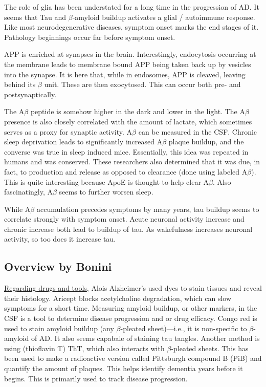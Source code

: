 The role of glia has been understated for a long time in the progression of AD. It seems that Tau and $\beta$-amyloid buildup activates a glial / autoimmune response. Like most neurodegenerative diseases, symptom onset marks the end stages of it. Pathology beginnings occur far before symptom onset.\newline

APP is enriched at synapses in the brain. Interestingly, endocytosis occurring at the membrane leads to membrane bound APP being taken back up by vesicles into the synapse. It is here that, while in endosomes, APP is cleaved, leaving behind its $\beta$ unit. These are then exocytosed. This can occur both pre- and postsynaptically.\newline

The A$\beta$ peptide is somehow higher in the dark and lower in the light. The A$\beta$ presence is also closely correlated with the amount of lactate, which sometimes serves as a proxy for synaptic activity. A$\beta$ can be measured in the CSF. Chronic sleep deprivation leads to significantly increased A$\beta$ plaque buildup, and the converse was true in sleep induced mice. Essentially, this idea was repeated in humans and was conserved. These researchers also determined that it was due, in fact, to production and release as opposed to clearance (done using labeled A$\beta$). This is quite interesting because ApoE is thought to help clear A$\beta$. Also fascinatingly, A$\beta$ seems to further worsen sleep.\newline

While A$\beta$ accumulation precedes symptoms by many years, tau buildup seems to correlate strongly with symptom onset. Acute neuronal activity increase and chronic increase both lead to buildup of tau. As wakefulness increases neuronal activity, so too does it increase tau.\newline

\subsection*{Overview by Bonini}

\underline{Regarding drugs and tools}, Alois Alzheimer's used dyes to stain tissues and reveal their histology. Aricept blocks acetylcholine degradation, which can slow symptoms for a short time. Measuring amyloid buildup, or other markers, in the CSF is a tool to determine disease progression and or drug efficacy. Congo red is used to stain amyloid buildup (any $\beta$-pleated sheet)---i.e., it is non-specific to $\beta$-amyloid of AD. It also seems capabale of staining tau tangles. Another method is using (thioflavin T) ThT, which also interacts with $\beta$-pleated sheets. This has been used to make a radioactive version called Pittsburgh compound B (PiB) and quantify the amount of plaques. This helps identify dementia years before it begins. This is primarily used to track disease progression.\newline

